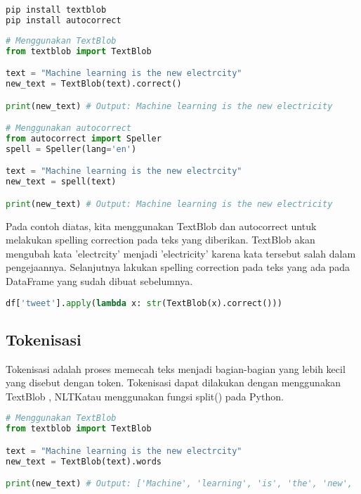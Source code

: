 \documentclass{article}
\begin{document}
    \begin{lstlisting}[language=bash, style=bashstyle]
pip install textblob
pip install autocorrect
    \end{lstlisting}    

    \begin{lstlisting}[language=python, style=pythonstyle]
# Menggunakan TextBlob
from textblob import TextBlob

text = "Machine learning is the new electrcity"
new_text = TextBlob(text).correct()

print(new_text) # Output: Machine learning is the new electricity

# Menggunakan autocorrect
from autocorrect import Speller
spell = Speller(lang='en')

text = "Machine learning is the new electrcity"
new_text = spell(text)

print(new_text) # Output: Machine learning is the new electricity
    \end{lstlisting}

    Pada contoh diatas, kita menggunakan TextBlob dan autocorrect untuk melakukan spelling correction pada teks yang diberikan.
    TextBlob akan mengubah kata \@'electrcity' menjadi \@'electricity' karena kata tersebut salah dalam pengejaannya.
    Selanjutnya lakukan spelling correction pada teks yang ada pada DataFrame yang sudah dibuat sebelumnya.
    
    \begin{lstlisting}[language=python, style=pythonstyle]
df['tweet'].apply(lambda x: str(TextBlob(x).correct()))
    \end{lstlisting}

    \subsection*{Tokenisasi}

    Tokenisasi adalah proses memecah teks menjadi bagian-bagian yang lebih kecil yang disebut dengan token.
    Tokenisasi dapat dilakukan dengan menggunakan TextBlob , NLTK\@ atau menggunakan fungsi split() pada Python.

    \begin{lstlisting}[language=python, style=pythonstyle]
# Menggunakan TextBlob
from textblob import TextBlob

text = "Machine learning is the new electrcity"
new_text = TextBlob(text).words

print(new_text) # Output: ['Machine', 'learning', 'is', 'the', 'new', 'electricity']
    \end{lstlisting}
\end{document}

